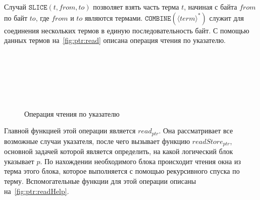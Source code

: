 Случай $\texttt{SLICE}(t,from,to)$ позволяет взять часть терма $t$, начиная с байта $from$ по байт $to$, где $from$ и $to$ являются термами. $\texttt{COMBINE}( \langle term \rangle ^*)$ служит для соединения нескольких термов в единую последовательность байт. С помощью данных термов на~\autoref{fig:ptr:read} описана операция чтения по указателю.

\begin{figure}[H]
\centering
\tiny
\setlength{\jot}{1pt}
\begin{mymathbox}
     \\
	 \\
     \\
     \\
     \\
\end{mymathbox}
\normalsize
\caption{Операция чтения по указателю} \label{fig:ptr:read}
\end{figure}

Главной функцией этой операции является $\mathit{read_{ptr}}$. Она рассматривает все возможные случаи указателя, после чего вызывает функцию $\mathit{readStore_{ptr}}$, основной задачей которой является определить, на какой логический блок указывает $p$. По нахождении необходимого блока происходит чтения окна из терма этого блока, которое выполняется с помощью рекурсивного спуска по терму. Вспомогательные функции для этой операции описаны на~\autoref{fig:ptr:readHelp}.

